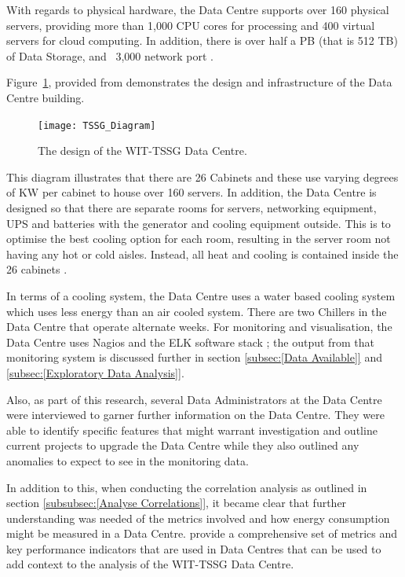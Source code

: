 \documentclass[12pt]{scrartcl}
\begin{document}
With regards to physical hardware, the Data Centre supports over 160 physical servers, providing more than 1,000 CPU cores for processing and 400 virtual servers for cloud computing.  In addition, there is over half a PB (that is 512 TB) of Data Storage, and ~3,000 network port \citep{TSSG}. 

Figure~\ref{fig:TSSGdataCentreDesign}, provided from \citet{TSSG} demonstrates the design and infrastructure of the Data Centre building.  

\begin{figure}[h]
  \caption{The design of the WIT-TSSG Data Centre.}
  \label{fig:TSSGdataCentreDesign}
  \centering
    \texttt{[image: TSSG\_Diagram]}
\end{figure}

This diagram illustrates that there are 26 Cabinets and these use varying degrees of KW per cabinet to house over 160 servers. In addition, the Data Centre is designed so that there are separate rooms for servers, networking equipment, UPS and batteries with the generator and cooling equipment outside. This is to optimise the best cooling option for each room, resulting in the server room not having any hot or cold aisles. Instead, all heat and cooling is contained inside the 26 cabinets \citep{TSSG}.

In terms of a cooling system, the Data Centre uses a water based cooling system which uses less energy than an air cooled system. There are two Chillers in the Data Centre that operate alternate weeks. For monitoring and visualisation, the Data Centre uses Nagios and the ELK software stack \citep{ELK}; the output from that monitoring system is discussed further in section \ref{subsec:[Data Available]} and \ref{subsec:[Exploratory Data Analysis]}. 

Also, as part of this research, several Data Administrators at the Data Centre were interviewed to garner further information on the Data Centre. They were able to identify specific features that might warrant investigation and outline current projects to upgrade the Data Centre while they also outlined any anomalies to expect to see in the monitoring data.  

In addition to this, when conducting the correlation analysis as outlined in section \ref{subsubsec:[Analyse Correlations]}, it became clear that further understanding was needed of the metrics involved and how energy consumption might be measured in a Data Centre. \citet{edseee.792155120170101} provide a comprehensive set of metrics and key performance indicators that are used in Data Centres that can be used to add context to the analysis of the WIT-TSSG Data Centre. 
\end{document}
